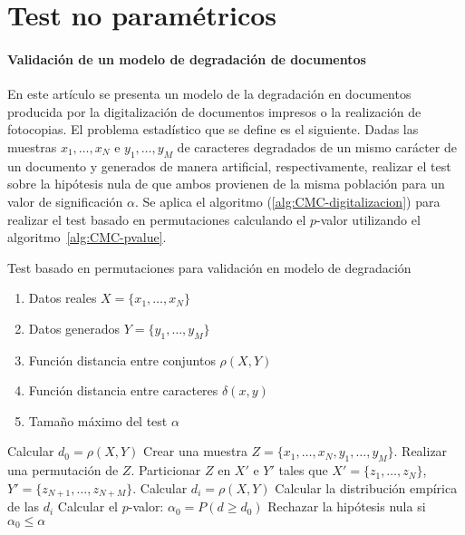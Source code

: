 \section{Test no paramétricos}
 
\paragraph{Validación de un modelo de degradación de 
documentos} \cite{DBLP:journals/pami/KanungoHBSM00} En este artículo se presenta un 
modelo de la degradación en documentos producida por la 
digitalización de documentos impresos o la realización de 
fotocopias. El problema estadístico que se define es el 
siguiente. Dadas las muestras $x_1, \dots, x_N$ e $y_1, 
\dots, y_M$ de caracteres degradados de un mismo carácter de 
un documento y generados de manera artificial, 
respectivamente, realizar el test sobre la hipótesis nula de 
que ambos  provienen de la misma población para un valor de 
significación $\alpha$. Se aplica el algoritmo 
(\ref{alg:CMC-digitalizacion}) para realizar el test basado 
en permutaciones calculando el $p$-valor utilizando el 
algoritmo~\ref{alg:CMC-pvalue}.

\begin{algorithm}
	\caption{Test basado en permutaciones para validación en 
			modelo de degradación}
	\label{alg:CMC-digitalizacion}
	\begin{algorithmic}[1]
	\REQUIRE
		\begin{enumerate}[a]
		\item Datos reales $X = \{ x_1, \dots, x_N \}$
		\item Datos generados $Y = \{ y_1, \dots, y_M \}$
		\item Función distancia entre conjuntos $\rho(X,Y)$
		\item Función distancia entre caracteres $\delta(x,y)$
		\item Tamaño máximo del test $\alpha$
		\end{enumerate}
		\STATE Calcular $d_0 = \rho(X,Y)$
		\STATE Crear una muestra 
			$Z= \{x_1, \dots, x_N, y_1, \dots, y_M \}$.
			\STATE Realizar una permutación de $Z$.
			\STATE Particionar $Z$ en $X'$ e $Y'$ tales que 
				$X' = \{ z_1, \dots, z_N \}$, $Y' = 
				\{ z_{N+1}, \dots, z_{N+M} \} $.
			\STATE Calcular $d_i = \rho(X,Y)$
		\ENDFOR
		\STATE Calcular la distribución empírica de las $d_i$
		\STATE Calcular el $p$-valor: 
			$\alpha_0 = P(d \geq d_0)$
		\STATE Rechazar la hipótesis nula si 
			$\alpha_0 \leq \alpha$
	\end{algorithmic}
\end{algorithm}

